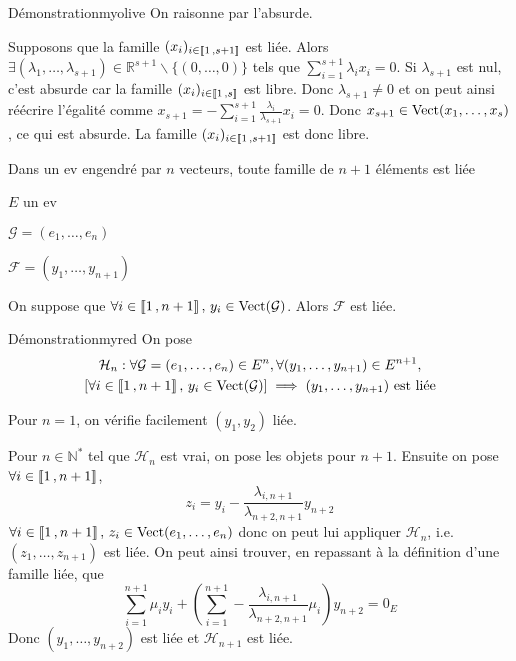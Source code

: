     \begin{demo}{Démonstration}{myolive}
        On raisonne par l’absurde.

        Supposons que la famille $(x_i)_{i \in \left\llbracket 1 \, , s+1 \right\rrbracket}$ est liée. Alors $\exists (\lambda_1,\ldots,\lambda_{s+1}) \in \mathbb{R}^{s+1} \backslash \{ (0,\ldots,0 ) \}$ tels que $\sum\limits_{i=1}^{s+1} \lambda_i x_i = 0$. Si $\lambda_{s+1}$ est nul, c’est absurde car la famille $(x_i)_{i \in \left\llbracket 1 \, , s \right\rrbracket}$ est libre. Donc $\lambda_{s+1} \neq 0$ et on peut ainsi réécrire l’égalité comme $x_{s+1} = - \sum\limits_{i=1}^{s+1} \frac{\lambda_i}{\lambda_{s+1}} x_i = 0$. Donc $x_{s+1} \in \operatorname{Vect}(x_1,\ldots,x_{s})$, ce qui est absurde. La famille $(x_i)_{i \in \left\llbracket 1 \, , s+1 \right\rrbracket}$ est donc libre.
    \end{demo}

    \begin{theo}{Dans un ev engendré par $n$ vecteurs, toute famille de $n + 1$ éléments est liée}{}
        \begin{soient}
            \item $E$ un ev
            \item $\mathcal{G} = (e_1,\ldots,e_n)$
            \item $\mathcal{F} = (y_1,\ldots,y_{n+1})$
        \end{soient}
        On suppose que $\forall i \in \left\llbracket 1 \, , n+1 \right\rrbracket, \, y_i \in \operatorname{Vect}(\mathcal{G})$.
        Alors $\mathcal{F}$ est liée.
    \end{theo}
    
    \begin{demo}{Démonstration}{myred}
        On pose \begin{multline*}
            \mathcal{H}_n : \forall \mathcal{G} = (e_1,\ldots,e_n) \in E^n, \forall (y_1,\ldots,y_{n+1}) \in E^{n+1}, \\
            \left[\forall i \in \left\llbracket 1 \, , n+1 \right\rrbracket, \, y_i \in \operatorname{Vect}(\mathcal{G}) \right] \implies (y_1,\ldots,y_{n+1}) \text{ est liée}
        \end{multline*}

        Pour $n = 1$, on vérifie facilement $(y_1,y_2)$ liée. 
    
        Pour $n \in \mathbb{N}^*$ tel que $\mathcal{H}_n$ est vrai, on pose les objets pour $n+1$. Ensuite on pose $\forall i \in \left\llbracket 1 \, , n+1 \right\rrbracket$, \[ z_i = y_i - \frac{\lambda_{i,n+1}}{\lambda_{n+2,n+1}}y_{n+2} \] 
        $\forall i \in \left\llbracket 1 \, , n+1 \right\rrbracket, \, z_i \in \operatorname{Vect}(e_1,\ldots,e_n)$ donc on peut lui appliquer $\mathcal{H}_n$, i.e. $(z_1,\ldots,z_{n+1})$ est liée. On peut ainsi trouver, en repassant à la définition d’une famille liée, que \[ \sum\limits_{i=1}^{n+1} \mu_i y_i + \left(\sum\limits_{i=1}^{n+1} -\frac{\lambda_{i,n+1}}{\lambda_{n+2,n+1}}\mu_i\right)y_{n+2}  = 0_E \]
        Donc $(y_1,\ldots,y_{n+2})$ est liée et $\mathcal{H}_{n+1}$ est liée.
    \end{demo}

